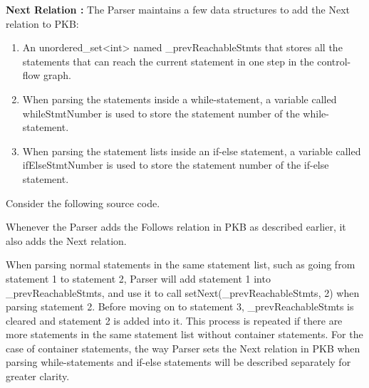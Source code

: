 \documentclass[12pt]{article}
\begin{document}
\textbf{Next Relation
:} The Parser maintains a few data structures to add the Next relation to PKB: 
\begin{enumerate}
\item An unordered\_set<int> named \_prevReachableStmts that stores all the statements that can reach the current statement in one step in the control-flow graph.
\item When parsing the statements inside a while-statement, a variable called whileStmtNumber is used to store the statement number of the while-statement.
\item When parsing the statement lists inside an if-else statement, a variable called ifElseStmtNumber is used to store the statement number of the if-else statement.
\end{enumerate}
Consider the following source code. 
\begin{center}
\end{center}
\vspace{10mm}
Whenever the Parser adds the Follows relation in PKB as described earlier, it also adds the Next relation. \newline

When parsing normal statements in the same statement list, such as going from statement 1 to statement 2, Parser will add statement 1 into \_prevReachableStmts, and use it to call setNext(\_prevReachableStmts, 2) when parsing statement 2. Before moving on to statement 3, \_prevReachableStmts is cleared and statement 2 is added into it. This process is repeated if there are more statements in the same statement list without container statements. For the case of container statements, the way Parser sets the Next relation in PKB when parsing while-statements and if-else statements will be described separately for greater clarity. \newline
\end{document}
